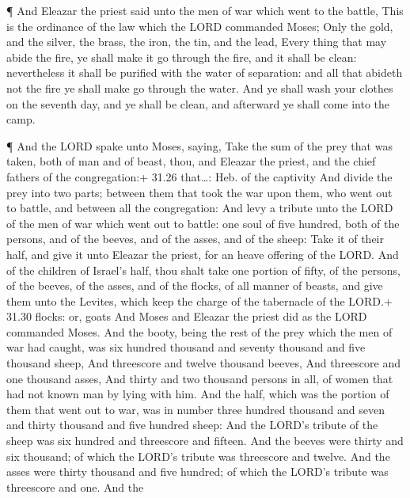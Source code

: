  ¶ And Eleazar the priest said unto the men of war which
went to the battle, This is the ordinance of the law which the LORD
commanded Moses;  Only the gold, and the silver, the brass,
the iron, the tin, and the lead,  Every thing that may
abide the fire, ye shall make it go through the fire, and it shall be
clean: nevertheless it shall be purified with the water of separation:
and all that abideth not the fire ye shall make go through the water.
 And ye shall wash your clothes on the seventh day, and ye
shall be clean, and afterward ye shall come into the camp.

 ¶ And the LORD spake unto Moses, saying, 
Take the sum of the prey that was taken, both of man and of beast, thou,
and Eleazar the priest, and the chief fathers of the congregation:+
31.26 that\ldots: Heb. of the captivity  And divide the
prey into two parts; between them that took the war upon them, who went
out to battle, and between all the congregation:  And levy
a tribute unto the LORD of the men of war which went out to battle: one
soul of five hundred, both of the persons, and of the beeves, and of the
asses, and of the sheep:  Take it of their half, and give
it unto Eleazar the priest, for an heave offering of the LORD.
 And of the children of Israel's half, thou shalt take one
portion of fifty, of the persons, of the beeves, of the asses, and of
the flocks, of all manner of beasts, and give them unto the Levites,
which keep the charge of the tabernacle of the LORD.+ 31.30 flocks: or,
goats  And Moses and Eleazar the priest did as the LORD
commanded Moses.  And the booty, being the rest of the prey
which the men of war had caught, was six hundred thousand and seventy
thousand and five thousand sheep,  And threescore and
twelve thousand beeves,  And threescore and one thousand
asses,  And thirty and two thousand persons in all, of
women that had not known man by lying with him.  And the
half, which was the portion of them that went out to war, was in number
three hundred thousand and seven and thirty thousand and five hundred
sheep:  And the LORD's tribute of the sheep was six hundred
and threescore and fifteen.  And the beeves were thirty and
six thousand; of which the LORD's tribute was threescore and twelve.
 And the asses were thirty thousand and five hundred; of
which the LORD's tribute was threescore and one.  And the
